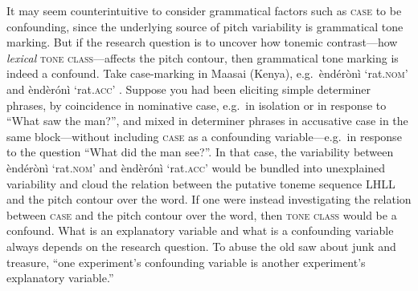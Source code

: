 \documentclass[12pt]{article}
\begin{document}
It may seem
counterintuitive to consider grammatical factors such as
\textsc{case} to be confounding, since the underlying source of pitch
variability is grammatical tone marking. But if the research question
is to uncover how tonemic contrast---how \textit{lexical} \textsc{tone class}---affects the
pitch contour, then grammatical tone marking is indeed a
confound. Take case-marking in Maasai (Kenya), e.g.\ \`end\'er\`on\`i
`rat.\textsc{nom}' and \`end\`er\'on\`i `rat.\textsc{acc}'
\citep[p.\ 203]{Hyman:2011b}. Suppose you had been eliciting simple
determiner phrases, by coincidence in nominative case, e.g.\ in
isolation or in response to ``What saw the man?'',  and mixed in
determiner phrases in accusative case in the same block---without
including \textsc{case} as a confounding variable---e.g.\ in
response to the question ``What did the man see?''. In that case, the
variability between \`end\'er\`on\`i
`rat.\textsc{nom}' and \`end\`er\'on\`i `rat.\textsc{acc}' would be
bundled into unexplained variability and cloud the relation between
the putative toneme sequence LHLL and the pitch contour over the word. If one
were instead investigating the relation between \textsc{case} and the
pitch contour over the word, then \textsc{tone class} would
be a confound. What is an explanatory variable and what is a
confounding variable always depends on the research question. To abuse
the old saw about junk and treasure,
``one experiment's confounding variable is another experiment's explanatory variable.''
\end{document}
